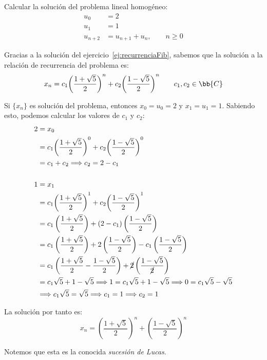 \begin{ejercicio}
    Calcular la solución del problema lineal homogéneo:
    \begin{align*}
        u_0 &= 2 \\
        u_1 &= 1 \\
        u_{n+2} &= u_{n+1} + u_n,\qquad n\geq 0
    \end{align*}

    Gracias a la solución del ejercicio~\ref{ej:recurrenciaFib}, sabemos que la solución a la relación de recurrencia del problema es:
    \begin{equation*}
        x_n = c_1{\left(\dfrac{1+\sqrt{5}}{2}\right)}^n + c_2 {\left(\dfrac{1-\sqrt{5}}{2}\right)}^n
        \qquad c_1,c_2\in \bb{C}
    \end{equation*}

    Si $\{x_n\}$ es solución del problema, entonces $x_0 = u_0 = 2$ y $x_1 = u_1 = 1$. Sabiendo esto,
    podemos calcular los valores de $c_1$ y $c_2$:
    \begin{align*}
        2 &= x_0 \\
          &= c_1{\left(\dfrac{1+\sqrt{5}}{2}\right)}^0 + c_2 {\left(\dfrac{1-\sqrt{5}}{2}\right)}^0\\
          &= c_1 + c_2 \Longrightarrow c_2 = 2-c_1\\ \\
        1 &= x_1 \\
          &= c_1 {\left(\dfrac{1+\sqrt{5}}{2}\right)}^1 + c_2 {\left(\dfrac{1-\sqrt{5}}{2}\right)}^1 \\
          &= c_1 \left(\dfrac{1+\sqrt{5}}{2}\right) + (2- c_1) \left(\dfrac{1-\sqrt{5}}{2}\right) \\
          &= c_1 \left(\dfrac{1+\sqrt{5}}{2}\right) + 2 \left(\dfrac{1-\sqrt{5}}{2}\right)-c_1\left(\dfrac{1-\sqrt{5}}{2}\right) \\
          &= c_1 \left(\dfrac{1+\sqrt{5}}{2}-\dfrac{1-\sqrt{5}}{2}\right) + \cancel{2}\left(\dfrac{1-\sqrt{5}}{\cancel{2}}\right) \\
          &= c_1 \sqrt{5} +1 - \sqrt{5} 
          \Longrightarrow 1 = c_1 \sqrt{5} + 1 -\sqrt{5}
          \Longrightarrow 0 = c_1\sqrt{5}-\sqrt{5} \\
          &\Longrightarrow c_1\sqrt{5} = \sqrt{5} \Longrightarrow c_1 = 1 \Longrightarrow c_2 = 1
    \end{align*}

    La solución por tanto es:
    \begin{equation*}
        x_n = {\left(\dfrac{1+\sqrt{5}}{2}\right)}^n + {\left(\dfrac{1-\sqrt{5}}{2}\right)}^n
    \end{equation*}

    Notemos que esta es la conocida \emph{sucesión de Lucas}.
\end{ejercicio}

